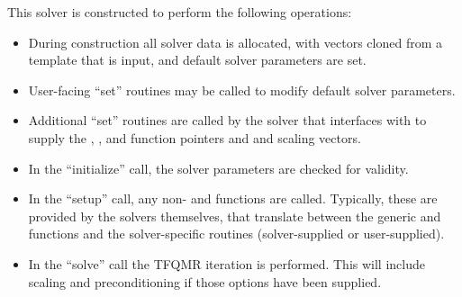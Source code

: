 This solver is constructed to perform the following operations:
\begin{itemize}
\item During construction all {\nvector} solver data is allocated,
  with vectors cloned from a template {\nvector} that is input, and
  default solver parameters are set.
\item User-facing ``set'' routines may be called to modify default
  solver parameters.
\item Additional ``set'' routines are called by the {\sundials} solver
  that interfaces with {\sunlinsolsptfqmr} to supply the ,
  ,  and  function pointers and
   and  scaling vectors.
\item In the ``initialize'' call, the solver parameters are checked
  for validity.
\item In the ``setup'' call, any non-  and
   functions are called.  Typically, these are provided by
  the {\sundials} solvers themselves, that translate between the
  generic  and  functions and the
  solver-specific routines (solver-supplied or user-supplied).
\item In the ``solve'' call the TFQMR iteration is performed.  This
  will include scaling and preconditioning if those options have been
  supplied.
\end{itemize}

